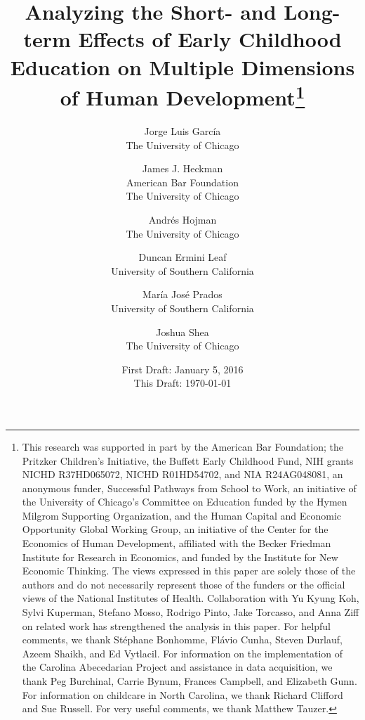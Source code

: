 






\title{\Large \textbf{Analyzing the Short- and Long-term Effects of Early Childhood Education on Multiple Dimensions of Human Development}\thanks{This research was supported in part by the American Bar Foundation; the Pritzker Children's Initiative, the
Buffett Early Childhood Fund, NIH grants NICHD R37HD065072, NICHD R01HD54702, and NIA R24AG048081, an
anonymous funder, Successful Pathways from School to Work, an initiative of the University of Chicago's Committee
on Education funded by the Hymen Milgrom Supporting Organization, and the Human Capital and Economic
Opportunity Global Working Group, an initiative of the Center for the Economics of Human Development, affiliated with
the Becker Friedman Institute for Research in Economics, and funded by the Institute for New Economic Thinking. The
views expressed in this paper are solely those of the authors and do not necessarily represent those of the funders or
the official views of the National Institutes of Health. Collaboration with Yu Kyung Koh, Sylvi Kuperman, Stefano Mosso, Rodrigo Pinto, Jake Torcasso, and Anna Ziff on related work has strengthened the analysis in this paper. For helpful comments, we thank St\'{e}phane Bonhomme, Fl\'{a}vio Cunha, Steven Durlauf, Azeem Shaikh, and Ed Vytlacil. For information on the implementation of the Carolina Abecedarian Project and assistance in data acquisition, we thank Peg Burchinal, Carrie Bynum, Frances Campbell, and Elizabeth Gunn. For information on childcare in North Carolina, we thank Richard Clifford and Sue Russell. For very useful comments, we thank Matthew Tauzer.}}

\author{
Jorge Luis Garc\'{i}a\\
The University of Chicago \and
James J. Heckman \\
American Bar Foundation \\
The University of Chicago \and
Andr\'{e}s Hojman\\
The University of Chicago \and
Duncan Ermini Leaf \\ 
University of Southern California \and
Mar\'{i}a Jos\'{e} Prados \\
University of Southern California \and
Joshua Shea \\
The University of Chicago}
\date{First Draft: January 5, 2016\\ This Draft: \today}
\maketitle
\thispagestyle{empty}

